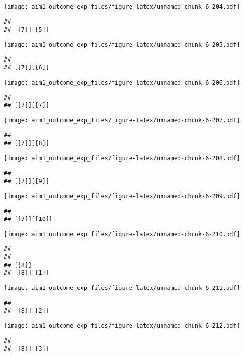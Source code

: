 \documentclass[
]{article}
\begin{document}
\texttt{[image: aim1\_outcome\_exp\_files/figure-latex/unnamed-chunk-6-204.pdf]}

\begin{verbatim}
## 
## [[7]][[5]]
\end{verbatim}

\texttt{[image: aim1\_outcome\_exp\_files/figure-latex/unnamed-chunk-6-205.pdf]}

\begin{verbatim}
## 
## [[7]][[6]]
\end{verbatim}

\texttt{[image: aim1\_outcome\_exp\_files/figure-latex/unnamed-chunk-6-206.pdf]}

\begin{verbatim}
## 
## [[7]][[7]]
\end{verbatim}

\texttt{[image: aim1\_outcome\_exp\_files/figure-latex/unnamed-chunk-6-207.pdf]}

\begin{verbatim}
## 
## [[7]][[8]]
\end{verbatim}

\texttt{[image: aim1\_outcome\_exp\_files/figure-latex/unnamed-chunk-6-208.pdf]}

\begin{verbatim}
## 
## [[7]][[9]]
\end{verbatim}

\texttt{[image: aim1\_outcome\_exp\_files/figure-latex/unnamed-chunk-6-209.pdf]}

\begin{verbatim}
## 
## [[7]][[10]]
\end{verbatim}

\texttt{[image: aim1\_outcome\_exp\_files/figure-latex/unnamed-chunk-6-210.pdf]}

\begin{verbatim}
## 
## 
## [[8]]
## [[8]][[1]]
\end{verbatim}

\texttt{[image: aim1\_outcome\_exp\_files/figure-latex/unnamed-chunk-6-211.pdf]}

\begin{verbatim}
## 
## [[8]][[2]]
\end{verbatim}

\texttt{[image: aim1\_outcome\_exp\_files/figure-latex/unnamed-chunk-6-212.pdf]}

\begin{verbatim}
## 
## [[8]][[3]]
\end{verbatim}
\end{document}
